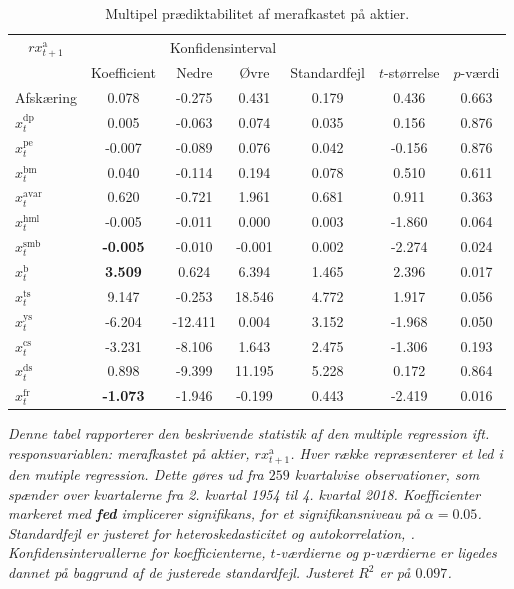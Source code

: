 \documentclass[
  a4paper,
  oneside]{memoir}
\begin{document}
\begin{table}[H]
\caption{\label{tab:MULT-ak}Multipel prædiktabilitet af merafkastet på aktier.}
\centering
\begin{threeparttable}
\begin{tabular}[t]{lcccccc}
\toprule
\multicolumn{1}{c}{$rx_{t+1}^{\text{a}}$} & \multicolumn{1}{c}{ } & \multicolumn{2}{c}{Konfidensinterval} & \multicolumn{3}{c}{ } \\
\cmidrule(l{3pt}r{3pt}){1-1} \cmidrule(l{3pt}r{3pt}){3-4}
  & Koefficient & Nedre & Øvre & Standardfejl & $t$-størrelse & $p$-værdi\\
\midrule
\rowcolor{gray!6}  Afskæring & 0.078 & -0.275 & 0.431 & 0.179 & 0.436 & 0.663\\
$x_t^{\text{dp}}$ & 0.005 & -0.063 & 0.074 & 0.035 & 0.156 & 0.876\\
\rowcolor{gray!6}  $x_t^{\text{pe}}$ & -0.007 & -0.089 & 0.076 & 0.042 & -0.156 & 0.876\\
$x_t^{\text{bm}}$ & 0.040 & -0.114 & 0.194 & 0.078 & 0.510 & 0.611\\
\rowcolor{gray!6}  $x_t^{\text{avar}}$ & 0.620 & -0.721 & 1.961 & 0.681 & 0.911 & 0.363\\
$x_t^{\text{hml}}$ & -0.005 & -0.011 & 0.000 & 0.003 & -1.860 & 0.064\\
\rowcolor{gray!6}  $x_t^{\text{smb}}$ & \textbf{-0.005} & -0.010 & -0.001 & 0.002 & -2.274 & 0.024\\
$x_t^{\text{b}}$ & \textbf{ 3.509} & 0.624 & 6.394 & 1.465 & 2.396 & 0.017\\
\rowcolor{gray!6}  $x_t^{\text{ts}}$ & 9.147 & -0.253 & 18.546 & 4.772 & 1.917 & 0.056\\
$x_t^{\text{ys}}$ & -6.204 & -12.411 & 0.004 & 3.152 & -1.968 & 0.050\\
\rowcolor{gray!6}  $x_t^{\text{cs}}$ & -3.231 & -8.106 & 1.643 & 2.475 & -1.306 & 0.193\\
$x_t^{\text{ds}}$ & 0.898 & -9.399 & 11.195 & 5.228 & 0.172 & 0.864\\
\rowcolor{gray!6}  $x_t^{\text{fr}}$ & \textbf{-1.073} & -1.946 & -0.199 & 0.443 & -2.419 & 0.016\\
\bottomrule
\end{tabular}
\begin{tablenotes}
\item \textit{Denne tabel rapporterer den beskrivende statistik af den multiple regression ift. responsvariablen: merafkastet på aktier, $rx_{t+1}^{\text{a}}$. Hver række repræsenterer et led i den mutiple regression. Dette gøres ud fra $259$ kvartalvise observationer, som spænder over kvartalerne fra 2. kvartal 1954 til 4. kvartal 2018. Koefficienter markeret med \textbf{fed} implicerer signifikans, for et signifikansniveau på $\alpha=0.05$. Standardfejl er justeret for heteroskedasticitet og autokorrelation, \citep{Newey1987}. Konfidensintervallerne for koefficienterne, $t$-værdierne og $p$-værdierne er ligedes dannet på baggrund af de justerede standardfejl. Justeret $R^2$ er på $0.097$.}
\end{tablenotes}
\end{threeparttable}
\end{table}
\end{document}
